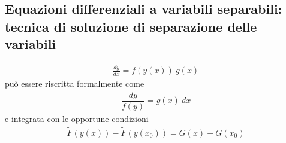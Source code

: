 \documentclass[letterpaper,10pt,italian]{jupyterBook}
\begin{document}
\subsection{Equazioni differenziali a variabili separabili: tecnica di soluzione di separazione delle variabili}
\label{\detokenize{ch/ode:equazioni-differenziali-a-variabili-separabili-tecnica-di-soluzione-di-separazione-delle-variabili}}\label{\detokenize{ch/ode:ode-hs-types-separable}}\begin{equation*}
\begin{split}\frac{d y}{d x} = f(y(x)) \ g(x) \end{split}
\end{equation*}
\sphinxAtStartPar
può essere riscritta formalmente come
\begin{equation*}
\begin{split}\dfrac{dy}{f(y)} = g(x) \ d x \end{split}
\end{equation*}
\sphinxAtStartPar
e integrata con le opportune condizioni
\begin{equation*}
\begin{split}\tilde{F}(y(x)) - \tilde{F}(y(x_0)) = G(x) - G(x_0)\end{split}
\end{equation*}
\end{document}

